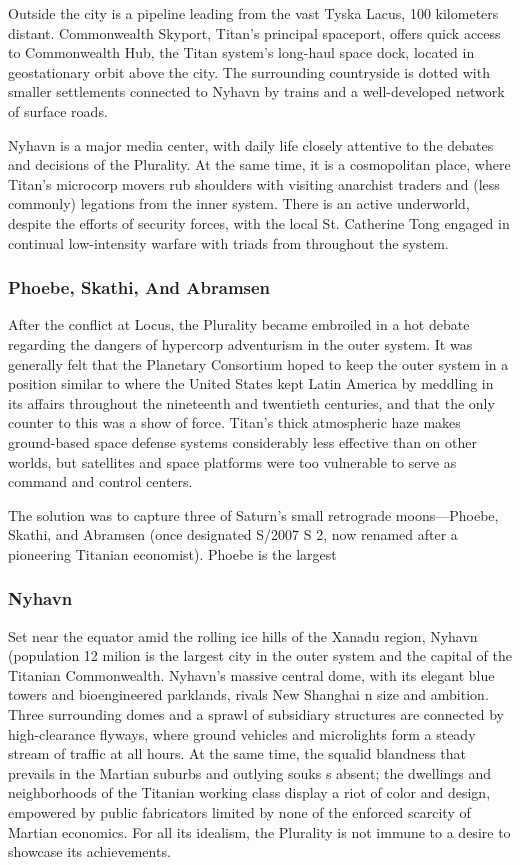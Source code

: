 Outside the city is a pipeline leading from the 
vast Tyska Lacus, 100 kilometers distant. Commonwealth
Skyport, Titan's principal spaceport, offers
quick access to Commonwealth Hub, the Titan system's
long-haul space dock, located in geostationary
orbit above the city. The surrounding countryside 
is dotted with smaller settlements connected to 
Nyhavn by trains and a well-developed network of 
surface roads.

Nyhavn is a major media center, with daily life 
closely attentive to the debates and decisions of 
the Plurality. At the same time, it is a cosmopolitan 
place, where Titan's microcorp movers rub shoulders 
with visiting anarchist traders and (less commonly) 
legations from the inner system. There is an active 
underworld, despite the efforts of security forces, 
with the local St. Catherine Tong engaged in continual
low-intensity warfare with triads from throughout
the system.

\subsubsection{Phoebe, Skathi, And Abramsen}

After the conflict at Locus, the Plurality became 
embroiled in a hot debate regarding the dangers of 
hypercorp adventurism in the outer system. It was 
generally felt that the Planetary Consortium hoped to 
keep the outer system in a position similar to where 
the United States kept Latin America by meddling in 
its affairs throughout the nineteenth and twentieth 
centuries, and that the only counter to this was a 
show of force. Titan's thick atmospheric haze makes 
ground-based space defense systems considerably 
less effective than on other worlds, but satellites and 
space platforms were too vulnerable to serve as command
and control centers.

The solution was to capture three of Saturn's small 
retrograde moons—Phoebe, Skathi, and Abramsen 
(once designated S/2007 S 2, now renamed after a 
pioneering Titanian economist). Phoebe is the largest 

\subsubsection{Nyhavn}

Set near the equator
amid the rolling ice
hills of  the Xanadu region, 
Nyhavn (population 12 milion
is the largest city in the outer
system and the capital of the Titanian 
Commonwealth. Nyhavn's massive central
dome, with its elegant blue towers and
bioengineered parklands, rivals New Shanghai 
n size and ambition. Three surrounding  domes 
and a sprawl of subsidiary structures are connected
by  high-clearance  flyways, where  ground vehicles
and microlights form a steady stream of traffic at all
hours. At the same time, the squalid blandness that
prevails in the Martian suburbs and outlying souks
s absent; the dwellings and neighborhoods of the 
Titanian working class display a riot of color and
design, empowered by public fabricators limited by
none of the enforced scarcity of Martian economics.
For all its idealism, the Plurality is not immune to a
desire to showcase its achievements.


